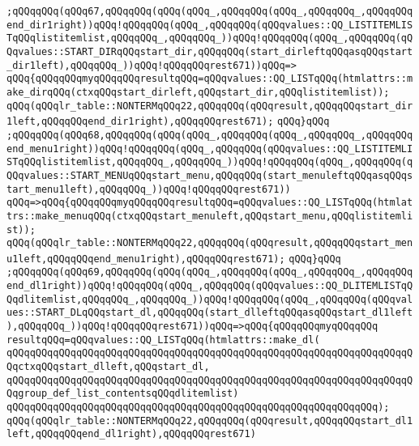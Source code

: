 \verb|;qQQqqQQq(qQQq67,qQQqqQQq(qQQq(qQQq_,qQQqqQQq(qQQq_,qQQqqQQq_,qQQqqQQqend_dir1right))qQQq!qQQqqQQq(qQQq_,qQQqqQQq(qQQqvalues::QQ_LISTITEMLISTqQQqlistitemlist,qQQqqQQq_,qQQqqQQq_))qQQq!qQQqqQQq(qQQq_,qQQqqQQq(qQQqvalues::START_DIRqQQqstart_dir,qQQqqQQq(start_dirleftqQQqasqQQqstart_dir1left),qQQqqQQq_))qQQq!qQQqqQQqrest671))qQQq=>|\newline
\verb|qQQq{qQQqqQQqmyqQQqqQQqresultqQQq=qQQqvalues::QQ_LISTqQQq(htmlattrs::make_dirqQQq(ctxqQQqstart_dirleft,qQQqstart_dir,qQQqlistitemlist));|\newline
\verb|qQQq(qQQqlr_table::NONTERMqQQq22,qQQqqQQq(qQQqresult,qQQqqQQqstart_dir1left,qQQqqQQqend_dir1right),qQQqqQQqrest671);|\newline
\verb|qQQq}qQQq|\newline
\verb|;qQQqqQQq(qQQq68,qQQqqQQq(qQQq(qQQq_,qQQqqQQq(qQQq_,qQQqqQQq_,qQQqqQQqend_menu1right))qQQq!qQQqqQQq(qQQq_,qQQqqQQq(qQQqvalues::QQ_LISTITEMLISTqQQqlistitemlist,qQQqqQQq_,qQQqqQQq_))qQQq!qQQqqQQq(qQQq_,qQQqqQQq(qQQqvalues::START_MENUqQQqstart_menu,qQQqqQQq(start_menuleftqQQqasqQQqstart_menu1left),qQQqqQQq_))qQQq!qQQqqQQqrest671))|\newline
\verb|qQQq=>qQQq{qQQqqQQqmyqQQqqQQqresultqQQq=qQQqvalues::QQ_LISTqQQq(htmlattrs::make_menuqQQq(ctxqQQqstart_menuleft,qQQqstart_menu,qQQqlistitemlist));|\newline
\verb|qQQq(qQQqlr_table::NONTERMqQQq22,qQQqqQQq(qQQqresult,qQQqqQQqstart_menu1left,qQQqqQQqend_menu1right),qQQqqQQqrest671);|\newline
\verb|qQQq}qQQq|\newline
\verb|;qQQqqQQq(qQQq69,qQQqqQQq(qQQq(qQQq_,qQQqqQQq(qQQq_,qQQqqQQq_,qQQqqQQqend_dl1right))qQQq!qQQqqQQq(qQQq_,qQQqqQQq(qQQqvalues::QQ_DLITEMLISTqQQqdlitemlist,qQQqqQQq_,qQQqqQQq_))qQQq!qQQqqQQq(qQQq_,qQQqqQQq(qQQqvalues::START_DLqQQqstart_dl,qQQqqQQq(start_dlleftqQQqasqQQqstart_dl1left),qQQqqQQq_))qQQq!qQQqqQQqrest671))qQQq=>qQQq{qQQqqQQqmyqQQqqQQq|\newline
\verb|resultqQQq=qQQqvalues::QQ_LISTqQQq(htmlattrs::make_dl(|\newline
\verb|qQQqqQQqqQQqqQQqqQQqqQQqqQQqqQQqqQQqqQQqqQQqqQQqqQQqqQQqqQQqqQQqqQQqqQQqctxqQQqstart_dlleft,qQQqstart_dl,|\newline
\verb|qQQqqQQqqQQqqQQqqQQqqQQqqQQqqQQqqQQqqQQqqQQqqQQqqQQqqQQqqQQqqQQqqQQqqQQqgroup_def_list_contentsqQQqdlitemlist)|\newline
\verb|qQQqqQQqqQQqqQQqqQQqqQQqqQQqqQQqqQQqqQQqqQQqqQQqqQQqqQQqqQQqqQQq);|\newline
\verb|qQQq(qQQqlr_table::NONTERMqQQq22,qQQqqQQq(qQQqresult,qQQqqQQqstart_dl1left,qQQqqQQqend_dl1right),qQQqqQQqrest671)|\newline

